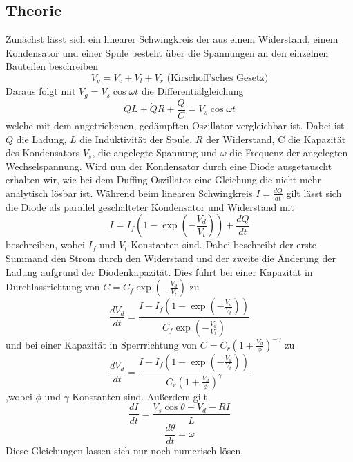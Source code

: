 \documentclass{scrartcl}
\begin{document}
\subsection { Theorie } \label{ssec:theo}
Zunächst lässt sich ein linearer Schwingkreis der aus einem Widerstand, einem Kondensator und einer Spule besteht über die Spannungen an den einzelnen Bauteilen beschreiben
$$V_g=V_c+V_l+V_r \text{ (Kirschoff'sches Gesetz)}$$
Daraus folgt mit $V_g=V_s\cos{\omega t}$ die Differentialgleichung
$$\ddot{Q}L + \dot{Q}R+ \frac{Q}{C} = V_s\cos{\omega t}$$
welche mit dem angetriebenen, gedämpften Oszillator vergleichbar ist. Dabei ist $Q$ die Ladung, $L$ die Induktivität der Spule, $R$ der Widerstand, C die Kapazität des Kondensators $V_s$, die angelegte Spannung und $\omega$ die Frequenz der angelegten Wechselspannung.
\newline
Wird nun der Kondensator durch eine Diode ausgetauscht erhalten wir, wie bei dem Duffing-Oszillator eine Gleichung die nicht mehr analytisch lösbar ist. Während beim linearen Schwingkreis $I=\frac{dQ}{dt}$ gilt lässt sich die Diode als parallel geschalteter Kondensator und Widerstand mit 
\begin{equation}I=I_f(1-\exp(-\frac{V_d}{V_t})) + \frac{dQ}{dt}\end{equation}
beschreiben, wobei $I_f$ und $V_t$ Konstanten sind. Dabei beschreibt der erste Summand den Strom durch den Widerstand und der zweite die Änderung der Ladung aufgrund der Diodenkapazität. 
Dies führt bei einer Kapazität in Durchlassrichtung von $C=C_f\exp(-\frac{V_d}{V_t})$ zu
\begin{equation}\frac{dV_d}{dt}= \frac{I-I_f(1-\exp(-\frac{V_d}{V_t}))}{C_f\exp(-\frac{V_d}{V_t})} \end{equation}
und bei einer Kapazität in Sperrrichtung von $C=C_r(1+\frac{V_d}{\phi})^{-\gamma}$ zu
\begin{equation}
\frac{dV_d}{dt}= \frac{I-I_f(1-\exp(-\frac{V_d}{V_t}))}{C_r(1+\frac{V_d}{\phi})^{\gamma}}
\end{equation}
,wobei $\phi$ und $\gamma$ Konstanten sind.
Außerdem gilt
\begin{equation}\frac{dI}{dt}=\frac{V_s \cos{\theta} - V_d - RI}{L}\end{equation}
\begin{equation}\frac{d\theta}{dt}=\omega\end{equation}
Diese Gleichungen lassen sich nur noch numerisch lösen.
\end{document}
